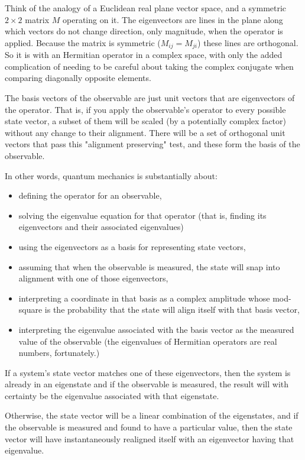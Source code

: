 Think of the analogy of a Euclidean real plane vector space, and a symmetric $2 \times 2$ matrix $M$ operating on it. The eigenvectors are lines in the plane along which vectors do not change direction, only magnitude, when the operator is applied. Because the matrix is symmetric ($M_{ij} = M_{ji}$) these lines are orthogonal. So it is with an Hermitian operator in a complex space, with only the added complication of needing to be careful about taking the complex conjugate when comparing diagonally opposite elements.

The basis vectors of the observable are just unit vectors that are eigenvectors of the operator. That is, if you apply the observable's operator to every possible state vector, a subset of them will be scaled (by a potentially complex factor) without any change to their alignment. There will be a set of orthogonal unit vectors that pass this "alignment preserving" test, and these form the basis of the observable.

In other words, quantum mechanics is substantially about:

\begin{itemize}
  \item defining the operator for an observable,
  \item solving the eigenvalue equation for that operator (that is, finding its eigenvectors and their associated eigenvalues)
  \item using the eigenvectors as a basis for representing state vectors,
  \item assuming that when the observable is measured, the state will snap into alignment with one of those eigenvectors,
  \item interpreting a coordinate in that basis as a complex amplitude whose mod-square is the probability that the state will align itself with that basis vector,
  \item interpreting the eigenvalue associated with the basis vector as the measured value of the observable (the eigenvalues of Hermitian operators are real numbers, fortunately.)
\end{itemize}

If a system's state vector matches one of these eigenvectors, then the system is already in an eigenstate and if the observable is measured, the result will with certainty be the eigenvalue associated with that eigenstate.

Otherwise, the state vector will be a linear combination of the eigenstates, and if the observable is measured and found to have a particular value, then the state vector will have instantaneously realigned itself with an eigenvector having that eigenvalue.

